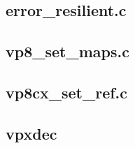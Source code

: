  \hypertarget{example_error_resilient}{}\subsection{error\+\_\+resilient.\+c}\label{example_error_resilient}
 \hypertarget{example_vp8_set_maps}{}\subsection{vp8\+\_\+set\+\_\+maps.\+c}\label{example_vp8_set_maps}
 \hypertarget{example_vp8cx_set_ref}{}\subsection{vp8cx\+\_\+set\+\_\+ref.\+c}\label{example_vp8cx_set_ref}
 \hypertarget{example_vpxdec}{}\subsection{vpxdec}\label{example_vpxdec}

